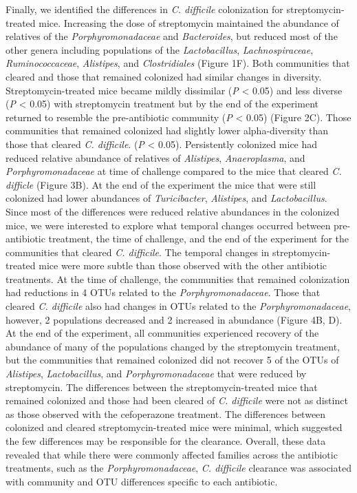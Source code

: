 \documentclass[11pt,]{article}
\begin{document}
Finally, we identified the differences in \emph{C. difficile}
colonization for streptomycin-treated mice. Increasing the dose of
streptomycin maintained the abundance of relatives of the
\emph{Porphyromonadaceae} and \emph{Bacteroides}, but reduced most of
the other genera including populations of the \emph{Lactobacillus},
\emph{Lachnospiraceae}, \emph{Ruminococcaceae}, \emph{Alistipes}, and
\emph{Clostridiales} (Figure 1F). Both communities that cleared and
those that remained colonized had similar changes in diversity.
Streptomycin-treated mice became mildly dissimilar (\emph{P} \textless{}
0.05) and less diverse (\emph{P} \textless{} 0.05) with streptomycin
treatment but by the end of the experiment returned to resemble the
pre-antibiotic community (\emph{P} \textless{} 0.05) (Figure 2C). Those
communities that remained colonized had slightly lower alpha-diversity
than those that cleared \emph{C. difficile}. (\emph{P} \textless{}
0.05). Persistently colonized mice had reduced relative abundance of
relatives of \emph{Alistipes}, \emph{Anaeroplasma}, and
\emph{Porphyromonadaceae} at time of challenge compared to the mice that
cleared \emph{C. difficle} (Figure 3B). At the end of the experiment the
mice that were still colonized had lower abundances of
\emph{Turicibacter}, \emph{Alistipes}, and \emph{Lactobacillus}. Since
most of the differences were reduced relative abundances in the
colonized mice, we were interested to explore what temporal changes
occurred between pre-antibiotic treatment, the time of challenge, and
the end of the experiment for the communities that cleared \emph{C.
difficile}. The temporal changes in streptomycin-treated mice were more
subtle than those observed with the other antibiotic treatments. At the
time of challenge, the communities that remained colonization had
reductions in 4 OTUs related to the \emph{Porphyromonadaceae}. Those
that cleared \emph{C. difficile} also had changes in OTUs related to the
\emph{Porphyromonadaceae}, however, 2 populations decreased and 2
increased in abundance (Figure 4B, D). At the end of the experiment, all
communities experienced recovery of the abundance of many of the
populations changed by the streptomycin treatment, but the communities
that remained colonized did not recover 5 of the OTUs of
\emph{Alistipes}, \emph{Lactobacillus}, and \emph{Porphyromonadaceae}
that were reduced by streptomycin. The differences between the
streptomycin-treated mice that remained colonized and those had been
cleared of \emph{C. difficile} were not as distinct as those observed
with the cefoperazone treatment. The differences between colonized and
cleared streptomycin-treated mice were minimal, which suggested the few
differences may be responsible for the clearance. Overall, these data
revealed that while there were commonly affected families across the
antibiotic treatments, such as the \emph{Porphyromonadaceae}, \emph{C.
difficile} clearance was associated with community and OTU differences
specific to each antibiotic.
\end{document}
